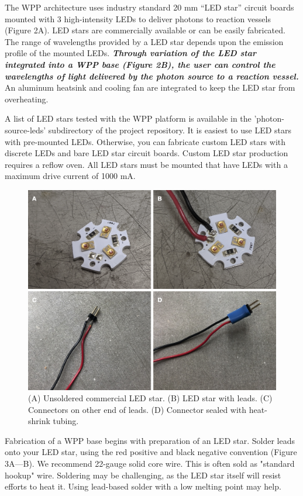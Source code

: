 \documentclass[11pt]{article}
\begin{document}
The WPP architecture uses industry standard 20 mm ``LED star'' circuit boards mounted with 3 high-intensity LEDs to deliver photons to reaction vessels (Figure 2A).
LED stars are commercially available or can be easily fabricated.
The range of wavelengths provided by a LED star depends upon the emission profile of the mounted LEDs.
\textbf{\textit{Through variation of the LED star integrated into a WPP base (Figure 2B), the user can control the wavelengths of light delivered by the photon source to a reaction vessel.}}
An aluminum heatsink and cooling fan are integrated to keep the LED star from overheating.

A list of LED stars tested with the WPP platform is available in the 'photon-source-leds' subdirectory of the project repository.
It is easiest to use LED stars with pre-mounted LEDs.
Otherwise, you can fabricate custom LED stars with discrete LEDs and bare LED star circuit boards.
Custom LED star production requires a reflow oven.
All LED stars must be mounted that have LEDs with a maximum drive current of 1000 mA.

\begin{figure}[H]
	\includegraphics[width=\textwidth]{"./fig3.png"}
	\caption{(A) Unsoldered commercial LED star. (B) LED star with leads. (C) Connectors on other end of leads. (D) Connector sealed with heat-shrink tubing.}
\end{figure}

Fabrication of a WPP base begins with preparation of an LED star.
Solder leads onto your LED star, using the red positive and black negative convention (Figure 3A---B).
We recommend 22-gauge solid core wire.
This is often sold as "standard hookup" wire.
Soldering may be challenging, as the LED star itself will resist efforts to heat it.
Using lead-based solder with a low melting point may help.
\end{document}
